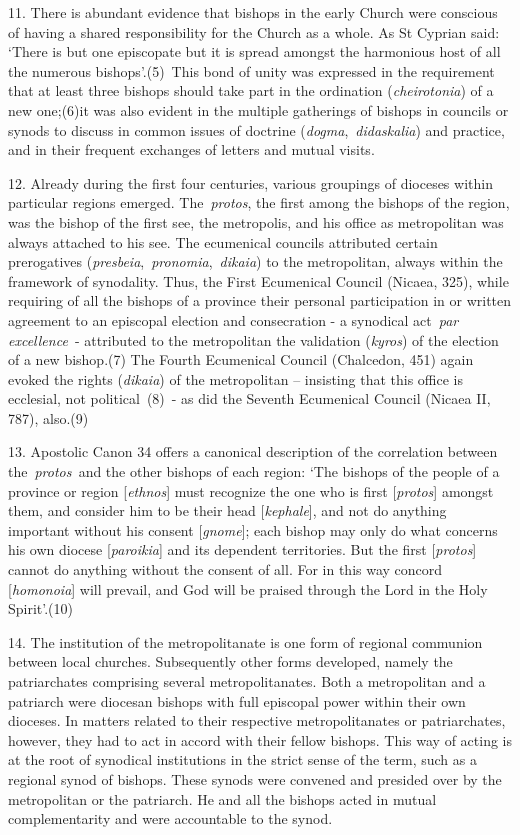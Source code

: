 11. There is abundant evidence that bishops in the early Church were
conscious of having a shared responsibility for the Church as a whole.
As St Cyprian said: `There is but one episcopate but it is spread
amongst the harmonious host of all the numerous bishops'.(5)~This bond
of unity was expressed in the requirement that at least three bishops
should take part in the ordination (\emph{cheirotonia}) of a new
one;(6)it was also evident in the multiple gatherings of bishops in
councils or synods to discuss in common issues of doctrine
(\emph{dogma},~\emph{didaskalia}) and practice, and in their frequent
exchanges of letters and mutual visits.

12. Already during the first four centuries, various groupings of
dioceses within particular regions emerged. The~\emph{protos}, the first
among the bishops of the region, was the bishop of the first see, the
metropolis, and his office as metropolitan was always attached to his
see. The ecumenical councils attributed certain prerogatives
(\emph{presbeia},~\emph{pronomia},~\emph{dikaia}) to the metropolitan,
always within the framework of synodality. Thus, the First Ecumenical
Council (Nicaea, 325), while requiring of all the bishops of a province
their personal participation in or written agreement to an episcopal
election and consecration - a synodical act~\emph{par excellence~}-
attributed to the metropolitan the validation (\emph{kyros}) of the
election of a new bishop.(7) The Fourth Ecumenical Council (Chalcedon,
451) again evoked the rights (\emph{dikaia}) of the metropolitan --
insisting that this office is ecclesial, not political~(8)~- as did the
Seventh Ecumenical Council (Nicaea II, 787), also.(9)

13. Apostolic Canon 34 offers a canonical description of the correlation
between the~\emph{protos~}and the other bishops of each region: `The
bishops of the people of a province or region {[}\emph{ethnos}{]} must
recognize the one who is first {[}\emph{protos}{]} amongst them, and
consider him to be their head {[}\emph{kephale}{]}, and not do anything
important without his consent {[}\emph{gnome}{]}; each bishop may only
do what concerns his own diocese {[}\emph{paroikia}{]} and its dependent
territories. But the first {[}\emph{protos}{]} cannot do anything
without the consent of all. For in this way concord
{[}\emph{homonoia}{]} will prevail, and God will be praised through the
Lord in the Holy Spirit'.(10)

14. The institution of the metropolitanate is one form of regional
communion between local churches. Subsequently other forms developed,
namely the patriarchates comprising several metropolitanates. Both a
metropolitan and a patriarch were diocesan bishops with full episcopal
power within their own dioceses. In matters related to their respective
metropolitanates or patriarchates, however, they had to act in accord
with their fellow bishops. This way of acting is at the root of
synodical institutions in the strict sense of the term, such as a
regional synod of bishops. These synods were convened and presided over
by the metropolitan or the patriarch. He and all the bishops acted in
mutual complementarity and were accountable to the synod.

